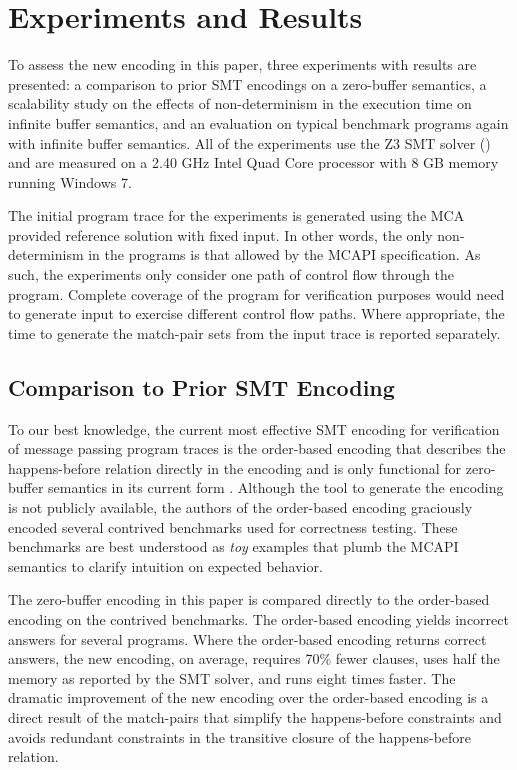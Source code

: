 \section{Experiments and Results}
To assess the new encoding in this paper, three experiments with
results are presented: a comparison to prior SMT encodings on a
zero-buffer semantics, a scalability study on the effects of
non-determinism in the execution time on infinite buffer semantics,
and an evaluation on typical benchmark programs again with infinite
buffer semantics. All of the experiments use the Z3 SMT solver
(\cite{demoura:tacas08}) and are measured on a 2.40 GHz Intel Quad
Core processor with 8 GB memory running Windows 7.

The initial program trace for the experiments is generated using the
MCA provided reference solution with fixed input. In other words, the
only non-determinism in the programs is that allowed by the MCAPI
specification. As such, the experiments only consider
one path of control flow through the program. Complete coverage of the
program for verification purposes would need to generate input to
exercise different control flow paths.  Where appropriate, the time to
generate the match-pair sets from the input trace is reported
separately.

\subsection{Comparison to Prior SMT Encoding}
To our best knowledge, the current most effective SMT encoding for
verification of message passing program traces is the order-based
encoding that describes the happens-before relation directly in the
encoding and is only functional for zero-buffer semantics in its
current form \cite{elwakil:padtad10}. Although the tool to generate
the encoding is not publicly available, the authors of the order-based
encoding graciously encoded several contrived benchmarks used for
correctness testing. These benchmarks are best understood as
\emph{toy} examples that plumb the MCAPI semantics to clarify
intuition on expected behavior.

The zero-buffer encoding in this paper is compared directly to the
order-based encoding on the contrived benchmarks. The order-based
encoding yields incorrect answers for several programs. Where the
order-based encoding returns correct answers, the new encoding, on
average, requires 70\% fewer clauses, uses half the memory as reported
by the SMT solver, and runs eight times faster. The dramatic
improvement of the new encoding over the order-based encoding is a
direct result of the match-pairs that simplify the happens-before
constraints and avoids redundant constraints in the transitive closure
of the happens-before relation.

